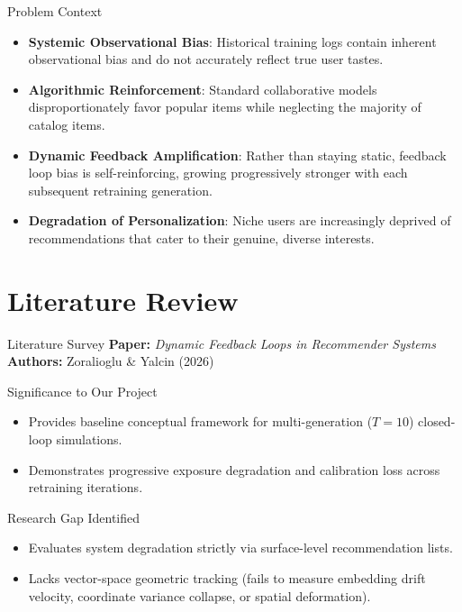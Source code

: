 \documentclass[11pt,aspectratio=43,xcolor=table]{beamer}
\begin{document}
\begin{frame}{Problem Context}

\begin{itemize}
    \item \textbf{Systemic Observational Bias}: Historical training logs contain inherent observational bias and do not accurately reflect true user tastes.
    \item \textbf{Algorithmic Reinforcement}: Standard collaborative models disproportionately favor popular items while neglecting the majority of catalog items.
    \item \textbf{Dynamic Feedback Amplification}: Rather than staying static, feedback loop bias is self-reinforcing, growing progressively stronger with each subsequent retraining generation.
    \item \textbf{Degradation of Personalization}: Niche users are increasingly deprived of recommendations that cater to their genuine, diverse interests.
\end{itemize}

\end{frame}

\section{Literature Review}

\begin{frame}{Literature Survey}
\small
\textbf{Paper:} \emph{Dynamic Feedback Loops in Recommender Systems} \\
\textbf{Authors:} Zoralioglu \& Yalcin (2026)

\vspace{0.15cm}
\begin{block}{Significance to Our Project}
\begin{itemize}
  \item Provides baseline conceptual framework for multi-generation ($T=10$) closed-loop simulations.
  \item Demonstrates progressive exposure degradation and calibration loss across retraining iterations.
\end{itemize}
\end{block}

\vspace{0.05cm}
\begin{block}{Research Gap Identified}
\begin{itemize}
  \item Evaluates system degradation strictly via surface-level recommendation lists.
  \item Lacks vector-space geometric tracking (fails to measure embedding drift velocity, coordinate variance collapse, or spatial deformation).
\end{itemize}
\end{block}
\end{frame}
\end{document}
